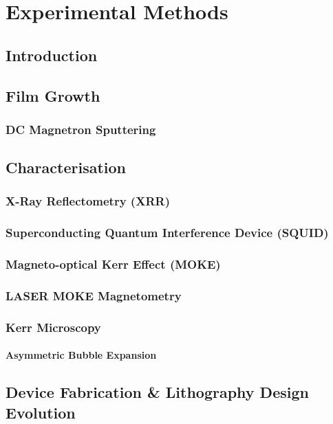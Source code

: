 \chapter{Experimental Methods}
\section{Introduction}

\section{Film Growth}
\subsection{DC Magnetron Sputtering}

\section{Characterisation}
\subsection{X-Ray Reflectometry (XRR)}

\subsection{Superconducting Quantum Interference Device (SQUID)}

\subsection{Magneto-optical Kerr Effect (MOKE)}

\subsection{LASER MOKE Magnetometry}

\subsection{Kerr Microscopy}
\subsubsection*{Asymmetric Bubble Expansion}

\section{Device Fabrication \& Lithography Design Evolution}

